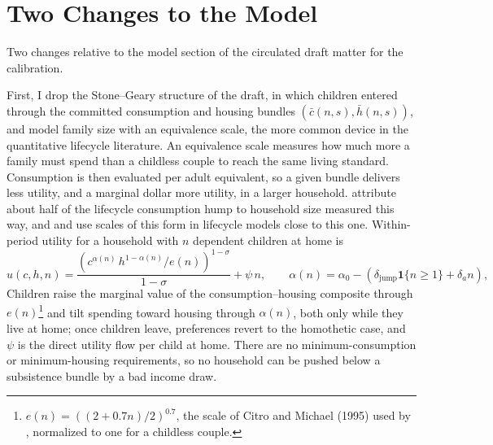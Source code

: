 \documentclass[11pt]{article}
\begin{document}
\section{Two Changes to the Model}
\label{sec:changes}

Two changes relative to the model section of the circulated draft matter for
the calibration.

First, I drop the Stone--Geary structure of the draft, in which children
entered through the committed consumption and housing bundles
$(\bar c(n,s),\bar h(n,s))$, and model family size with an equivalence scale,
the more common device in the quantitative lifecycle literature. An
equivalence scale measures how much more a family must spend than a childless
couple to reach the same living standard. Consumption is then evaluated per
adult equivalent, so a given bundle delivers less utility, and a marginal
dollar more utility, in a larger household.
\citet{fernandezVillaverdeKrueger2007} attribute about half of the lifecycle
consumption hump to household size measured this way, and
\citet{scholzSeshadriKhitatrakun2006} and \citet{borellaDeNardiYang2023} use
scales of this form in lifecycle models close to this one. Within-period
utility for a household with $n$ dependent children at home is
\begin{equation}
u(c,h,n)
=
\frac{\left(c^{\alpha(n)}\,h^{1-\alpha(n)}/e(n)\right)^{1-\sigma}}{1-\sigma}
+\psi\,n,
\qquad
\alpha(n)=\alpha_0-\left(\delta_{\mathrm{jump}}\mathbf 1\{n\geq1\}+\delta_a n\right),
\label{eq:eqscale_utility}
\end{equation}
Children raise the marginal value of the consumption--housing composite
through $e(n)$\footnote{$e(n)=((2+0.7n)/2)^{0.7}$, the scale of Citro and
Michael (1995) used by \citet{scholzSeshadriKhitatrakun2006}, normalized to
one for a childless couple.} and tilt spending toward housing through
$\alpha(n)$, both only while they live at home; once children leave,
preferences revert to the homothetic case, and $\psi$ is the direct utility
flow per child at home. There are no minimum-consumption or minimum-housing
requirements, so no household can be pushed below a subsistence bundle by a
bad income draw.
\end{document}
